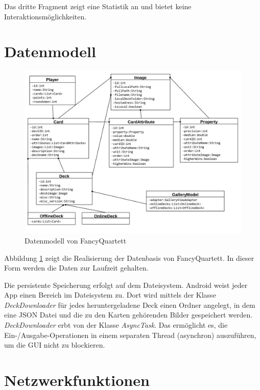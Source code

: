 Das dritte Fragment zeigt eine Statistik an und bietet keine Interaktionsmöglichkeiten.

\section{Datenmodell}
\label{sec:datenmodell}

\begin{figure}[ht]
    \centering
    \includegraphics[width=\textwidth]{../img/Datenmodell.pdf}
    \caption{Datenmodell von FancyQuartett}
    \label{fig:datenmodell}
\end{figure}

Abbildung \ref{fig:datenmodell} zeigt die Realisierung der Datenbasis von FancyQuartett. In dieser Form werden die Daten zur Laufzeit gehalten.

Die persistente Speicherung erfolgt auf dem Dateisystem. Android weist jeder App einen Bereich im Dateisystem zu. Dort wird mittels der Klasse \emph{DeckDownloader} für jedes heruntergeladene Deck einen Ordner angelegt, in dem eine JSON Datei und die zu den Karten gehörenden Bilder gespeichert werden. \emph{DeckDownloader} erbt von der Klasse \emph{AsyncTask}. Das ermöglicht es, die Ein-/Ausgabe-Operationen in einem separaten Thread (asynchron) auszuführen, um die GUI nicht zu blockieren.

\section{Netzwerkfunktionen}
\label{sec:netzwerkfunktionen}


